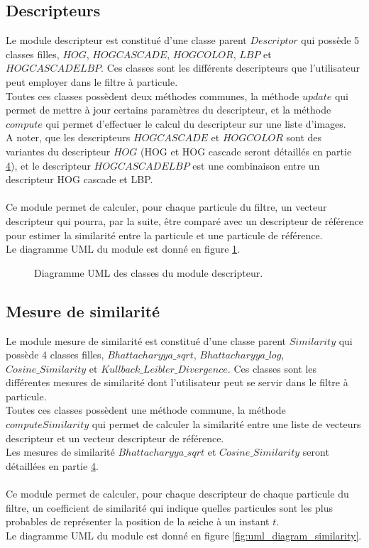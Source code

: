 \subsection{Descripteurs}
Le module descripteur est constitué d'une classe parent $Descriptor$ qui possède 5 classes filles, $HOG$, $HOGCASCADE$, $HOGCOLOR$, $LBP$ et $HOGCASCADELBP$. Ces classes sont les différents descripteurs que l'utilisateur peut employer dans le filtre à particule.\\
Toutes ces classes possèdent deux méthodes communes, la méthode $update$ qui permet de mettre à jour certains paramètres du descripteur, et la méthode $compute$ qui permet d'effectuer le calcul du descripteur sur une liste d'images.\\
A noter, que les descripteurs $HOGCASCADE$ et $HOGCOLOR$ sont des variantes du descripteur $HOG$ (HOG et HOG cascade seront détaillés en partie \hyperlink{chapter.4}{4}), et le descripteur $HOGCASCADELBP$ est une combinaison entre un descripteur HOG cascade et LBP.\\
\\
Ce module permet de calculer, pour chaque particule du filtre, un vecteur descripteur qui pourra, par la suite, être comparé avec un descripteur de référence pour estimer la similarité entre la particule et une particule de référence.\\
Le diagramme UML du module est donné en figure \ref{fig:uml_diagram_descriptor}.

\begin{figure}[!htbp]
\center
\caption{Diagramme UML des classes du module descripteur.}
\label{fig:uml_diagram_descriptor}
\end{figure}
\FloatBarrier




\subsection{Mesure de similarité}
Le module mesure de similarité est constitué d'une classe parent $Similarity$ qui possède 4 classes filles, $Bhattacharyya\_sqrt$, $Bhattacharyya\_log$, $Cosine\_Similarity$ et $Kullback\_Leibler\_Divergence$. Ces classes sont les différentes mesures de similarité dont l'utilisateur peut se servir dans le filtre à particule.\\
Toutes ces classes possèdent une méthode commune, la méthode $computeSimilarity$ qui permet de calculer la similarité entre une liste de vecteurs descripteur et un vecteur descripteur de référence.\\
Les mesures de similarité $Bhattacharyya\_sqrt$ et $Cosine\_Similarity$ seront détaillées en partie \hyperlink{chapter.4}{4}.\\
\\
Ce module permet de calculer, pour chaque descripteur de chaque particule du filtre, un coefficient de similarité qui indique quelles particules sont les plus probables de représenter la position de la seiche à un instant $t$.\\
Le diagramme UML du module est donné en figure \ref{fig:uml_diagram_similarity}.

